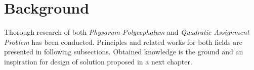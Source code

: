 \chapter{Background}
\label{chapter:background}

Thorough research of both \textit{Physarum Polycephalum} and \textit{Quadratic Assignment Problem} has been conducted. Principles and related works for both fields are presented in following subsections. Obtained knowledge is the ground and an inspiration for design of solution proposed in a next chapter.





